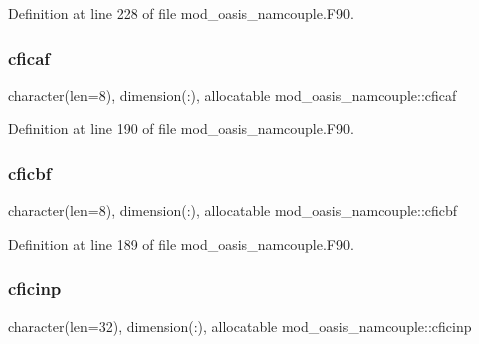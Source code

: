 Definition at line 228 of file mod\+\_\+oasis\+\_\+namcouple.\+F90.

\mbox{\label{namespacemod__oasis__namcouple_a9b3c7c879a3ff2b5eb15cbcaf5a8a1d9}} 
\subsubsection{\texorpdfstring{cficaf}{cficaf}}
{\footnotesize\ttfamily character(len=8), dimension(\+:), allocatable mod\+\_\+oasis\+\_\+namcouple\+::cficaf\hspace{0.3cm}{\ttfamily [private]}}



Definition at line 190 of file mod\+\_\+oasis\+\_\+namcouple.\+F90.

\mbox{\label{namespacemod__oasis__namcouple_a9e90e47fd11ff4dd95c61dcf3ec872ff}} 
\subsubsection{\texorpdfstring{cficbf}{cficbf}}
{\footnotesize\ttfamily character(len=8), dimension(\+:), allocatable mod\+\_\+oasis\+\_\+namcouple\+::cficbf\hspace{0.3cm}{\ttfamily [private]}}



Definition at line 189 of file mod\+\_\+oasis\+\_\+namcouple.\+F90.

\mbox{\label{namespacemod__oasis__namcouple_af17e746f51dcf0110428ebe55f6d7285}} 
\subsubsection{\texorpdfstring{cficinp}{cficinp}}
{\footnotesize\ttfamily character(len=32), dimension(\+:), allocatable mod\+\_\+oasis\+\_\+namcouple\+::cficinp\hspace{0.3cm}{\ttfamily [private]}}



